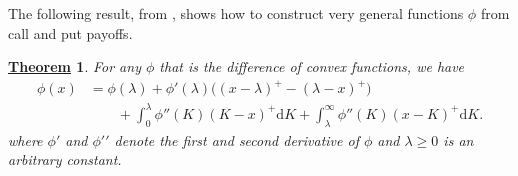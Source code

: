 \documentclass[12pt]{book}
\let\varphi\phi
\numberwithin{equation}{chapter}
\theoremstyle{plain}
\newtheorem{theorem}{\underline{Theorem}}
\numberwithin{theorem}{section}
\theoremstyle{definition}
\numberwithin{exercise}{chapter}
\newcommand{\<}{\langle}
\renewcommand{\>}{\rangle}
\renewcommand{\(}{\left(}
\renewcommand{\)}{\right)}
\renewcommand{\[}{\left[}
\renewcommand{\]}{\right]}
\newcommand\lam{\lambda}
\newcommand\dd{\mathrm{d}}
\theoremstyle{definition}
\numberwithin{question}{section}
\begin{document}
\noindent
The following result, from \cite{carrmadan1998}, shows how to construct very general functions $\varphi$ from call and put payoffs.

\begin{theorem}
\label{thm:carr-madan}
For any $\varphi$ that is the difference of convex functions, we have
\begin{align}
\varphi(x)
	&=	\varphi(\lambda) + \varphi'(\lambda) \Big( (x-\lambda)^+ - (\lambda - x)^+ \Big) \\ &\qquad
			+ \int_0^\lambda \varphi''(K) (K-x)^+ \dd K + \int_\lambda^\infty \varphi''(K) (x-K)^+ \dd K . \label{0}
\end{align}
where $\varphi{\prime}$ and $\varphi{\prime\prime}$ denote the first and second derivative of $\varphi$ and $\lam \geq 0$ is an arbitrary constant.
\end{theorem}
\end{document}
